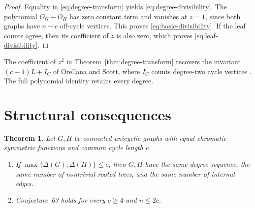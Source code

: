 \documentclass[11pt]{amsart}
\newtheorem{theorem}{Theorem}[section]
\theoremstyle{definition}
\newcommand{\cycle}{C}
\begin{document}
\begin{proof}
Equality in \eqref{eq:degree-transform} yields
\eqref{eq:degree-divisibility}.  The polynomial \(O_G-O_H\) has zero
constant term and vanishes at \(z=1\), since both graphs have \(n-c\)
off-cycle vertices.  This proves \eqref{eq:basic-divisibility}.  If the leaf
counts agree, then its coefficient of \(z\) is also zero, which proves
\eqref{eq:leaf-divisibility}.
\end{proof}

The coefficient of \(z^2\) in Theorem~\ref{thm:degree-transform} recovers
the invariant \((c-1)L+I_\cycle\) of Orellana and Scott, where
\(I_\cycle\) counts degree-two cycle vertices
\cite[Proposition~4.1]{OrellanaScott2014}.  The full polynomial identity
retains every degree.

\section{Structural consequences}

\begin{theorem}\label{thm:structural-range}
Let \(G,H\) be connected unicyclic graphs with equal chromatic symmetric
functions and common cycle length \(c\).
\begin{enumerate}
\item If \(\max\{\Delta(G),\Delta(H)\}\leq c\), then \(G,H\) have the same
degree sequence, the same number of nontrivial rooted trees, and the same
number of internal edges.
\item Conjecture~63 holds for every \(c\geq4\) and \(n\leq2c\).
\end{enumerate}
\end{theorem}
\end{document}
